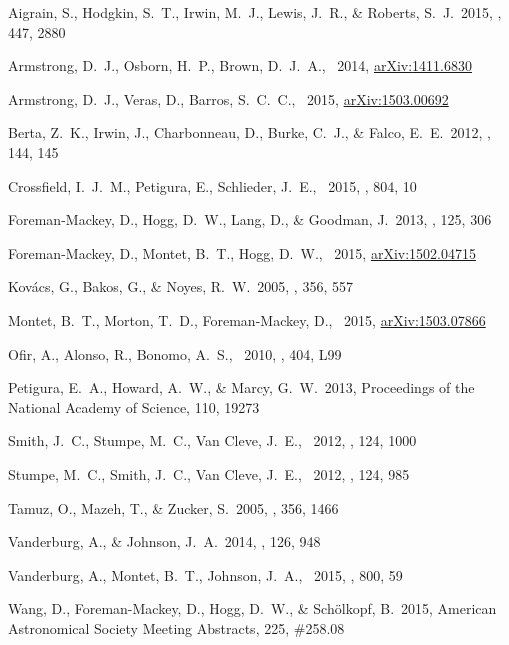 \documentclass[12pt,preprint]{aastex}
\begin{document}
\clearpage
\newcommand{\arxiv}[1]{{\href{http://arxiv.org/abs/#1}{arXiv:{#1}}}}
\begin{thebibliography}{}\raggedright%
\setlength{\itemsep}{0ex}%
\setlength{\parskip}{0ex}%
Aigrain, S., Hodgkin, S.~T., Irwin, M.~J., Lewis, J.~R., \& Roberts, S.~J.\
2015, \mnras, 447, 2880

Armstrong, D.~J., Osborn, H.~P., Brown, D.~J.~A., \etal\ 2014,
\arxiv{1411.6830}

Armstrong, D.~J., Veras, D., Barros, S.~C.~C., \etal\ 2015, \arxiv{1503.00692}

Berta, Z.~K., Irwin, J., Charbonneau, D., Burke, C.~J., \& Falco, E.~E.\ 2012,
\aj, 144, 145

Crossfield, I.~J.~M., Petigura, E., Schlieder, J.~E., \etal\ 2015, \apj, 804,
10

 Foreman-Mackey, 
D., Hogg, D.~W., Lang, D., \& Goodman, J.\ 2013, \pasp, 125, 306 

Foreman-Mackey, D., Montet, B.~T., Hogg, D.~W., \etal\ 2015, \arxiv{1502.04715}

Kov{\'a}cs, G., Bakos, G., \& Noyes, R.~W.\ 2005, \mnras, 356, 557

Montet, B.~T., Morton, T.~D., Foreman-Mackey, D., \etal\ 2015,
\arxiv{1503.07866}

Ofir, A., Alonso, R., Bonomo, A.~S., \etal\ 2010, \mnras, 404, L99

Petigura, E.~A., Howard, A.~W., \& Marcy, G.~W.\ 2013,
Proceedings of the National Academy of Science, 110, 19273

Smith, J.~C., Stumpe, M.~C., Van Cleve, J.~E., \etal\ 2012, \pasp, 124, 1000

Stumpe, M.~C., Smith, J.~C., Van Cleve, J.~E., \etal\ 2012, \pasp, 124, 985

Tamuz, O., Mazeh, T., \& Zucker, S.\ 2005, \mnras, 356, 1466

Vanderburg, A., \& Johnson, J.~A.\ 2014, \pasp, 126, 948

Vanderburg, A., Montet, B.~T., Johnson, J.~A., \etal\ 2015, \apj, 800, 59

Wang, D., Foreman-Mackey, D., Hogg, D.~W., \& Sch{\"o}lkopf, B.\ 2015,
American Astronomical Society Meeting Abstracts, 225, \#258.08

\end{thebibliography}
\end{document}
